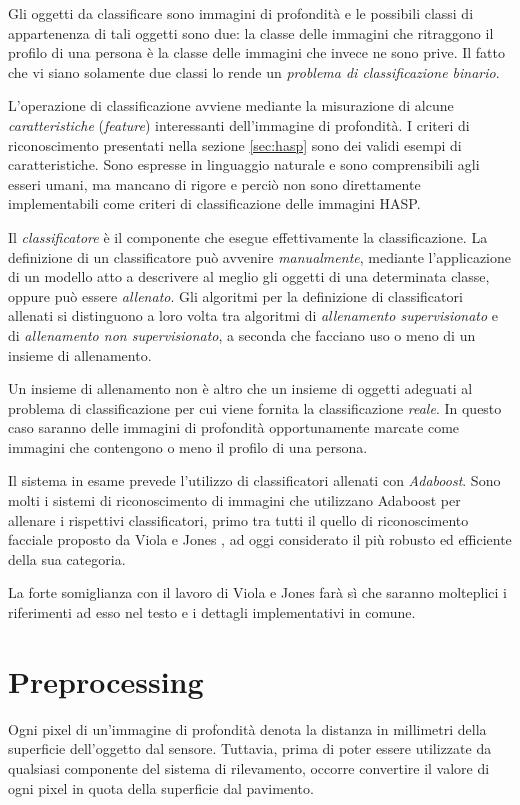Gli oggetti da classificare sono immagini di profondità e le possibili classi di appartenenza di tali oggetti sono due: la classe delle immagini che ritraggono il profilo di una persona è la classe delle immagini che invece ne sono prive.
Il fatto che vi siano solamente due classi lo rende un \emph{problema di classificazione binario}.

L'operazione di classificazione avviene mediante la misurazione di alcune \emph{caratteristiche} (\emph{feature}) interessanti dell'immagine di profondità.
I criteri di riconoscimento presentati nella sezione \ref{sec:hasp} sono dei validi esempi di caratteristiche. Sono espresse in linguaggio naturale e sono comprensibili agli esseri umani, ma mancano di rigore e perciò non sono direttamente implementabili come criteri di classificazione delle immagini HASP.

Il \emph{classificatore} è il componente che esegue effettivamente la classificazione. La definizione di un classificatore può avvenire \emph{manualmente}, mediante l'applicazione di un modello atto a descrivere al meglio gli oggetti di una determinata classe, oppure può essere \emph{allenato}.
Gli algoritmi per la definizione di classificatori allenati si distinguono a loro volta tra algoritmi di \emph{allenamento supervisionato} e di \emph{allenamento non supervisionato}, a seconda che facciano uso o meno di un insieme di allenamento.

Un insieme di allenamento non è altro che un insieme di oggetti adeguati al problema di classificazione per cui viene fornita la classificazione \emph{reale}.
In questo caso saranno delle immagini di profondità opportunamente marcate come immagini che contengono o meno il profilo di una persona.

Il sistema in esame prevede l'utilizzo di classificatori allenati con \emph{Adaboost}. Sono molti i sistemi di riconoscimento di immagini che utilizzano Adaboost per allenare i rispettivi classificatori, primo tra tutti il quello di riconoscimento facciale proposto da Viola e Jones \cite{Viola04}, ad oggi considerato il più robusto ed efficiente della sua categoria.

La forte somiglianza con il lavoro di Viola e Jones farà sì che saranno molteplici i riferimenti ad esso nel testo e i dettagli implementativi in comune.


\section{Preprocessing}
\label{sec:preprocessing}
Ogni pixel di un'immagine di profondità denota la distanza in millimetri della superficie dell'oggetto dal sensore. Tuttavia, prima di poter essere utilizzate da qualsiasi componente del sistema di rilevamento, occorre convertire il valore di ogni pixel in quota della superficie dal pavimento.

